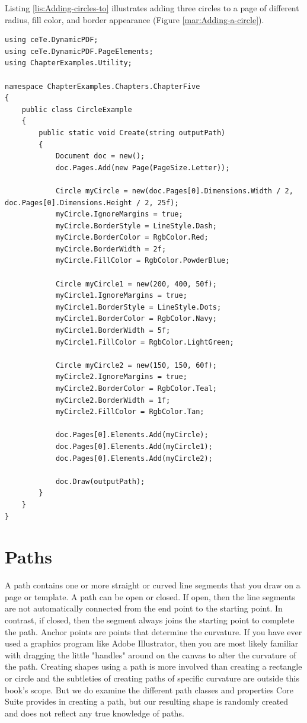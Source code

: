 \documentclass[american,letterpaper]{tufte-book}
\numberwithin{equation}{section}
\numberwithin{figure}{section}
\begin{document}
{{Listing \ref{lis:Adding-circles-to} illustrates adding three circles
to a page of different radius, fill color, and border appearance (Figure
\ref{mar:Adding-a-circle}).

\bgroup{}
\begin{lstlisting}[caption={Adding circles to a PDF document.},label={lis:Adding-circles-to},basicstyle={\small\ttfamily},breaklines=true]
using ceTe.DynamicPDF;
using ceTe.DynamicPDF.PageElements;
using ChapterExamples.Utility;

namespace ChapterExamples.Chapters.ChapterFive
{
    public class CircleExample
    {
        public static void Create(string outputPath)
        {
            Document doc = new();
            doc.Pages.Add(new Page(PageSize.Letter));

            Circle myCircle = new(doc.Pages[0].Dimensions.Width / 2, doc.Pages[0].Dimensions.Height / 2, 25f);
            myCircle.IgnoreMargins = true;
            myCircle.BorderStyle = LineStyle.Dash;
            myCircle.BorderColor = RgbColor.Red;
            myCircle.BorderWidth = 2f;
            myCircle.FillColor = RgbColor.PowderBlue;

            Circle myCircle1 = new(200, 400, 50f);
            myCircle1.IgnoreMargins = true;
            myCircle1.BorderStyle = LineStyle.Dots;
            myCircle1.BorderColor = RgbColor.Navy;
            myCircle1.BorderWidth = 5f;
            myCircle1.FillColor = RgbColor.LightGreen;

            Circle myCircle2 = new(150, 150, 60f);
            myCircle2.IgnoreMargins = true;
            myCircle2.BorderColor = RgbColor.Teal;
            myCircle2.BorderWidth = 1f;
            myCircle2.FillColor = RgbColor.Tan;

            doc.Pages[0].Elements.Add(myCircle);
            doc.Pages[0].Elements.Add(myCircle1);
            doc.Pages[0].Elements.Add(myCircle2);

            doc.Draw(outputPath);
        }
    }
}
\end{lstlisting}
\leavevmode\egroup


\section{Paths}

A path contains one or more straight or curved line segments that
you draw on a page or template. A path can be open or closed. If open,
then the line segments are not automatically connected from the end
point to the starting point. In contrast, if closed, then the segment
always joins the starting point to complete the path. Anchor points
are points that determine the curvature. If you have ever used a graphics
program like Adobe Illustrator, then you are most likely familiar
with dragging the little "handles" around on the canvas to alter
the curvature of the path. Creating shapes using a path is more involved
than creating a rectangle or circle and the subtleties of creating
paths of specific curvature are outside this book's scope. But we
do examine the different path classes and properties Core Suite provides
in creating a path, but our resulting shape is randomly created and
does not reflect any true knowledge of paths.

}}
\end{document}
